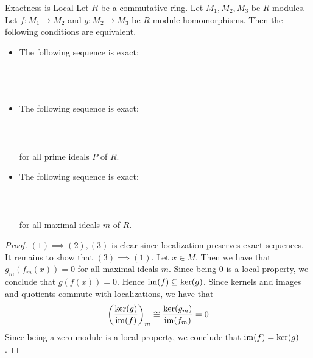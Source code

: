 \documentclass[a4paper]{article}
\begin{document}
\begin{prp}{Exactness is Local}{} Let $R$ be a commutative ring. Let $M_1,M_2,M_3$ be $R$-modules. Let $f:M_1\to M_2$ and $g:M_2\to M_3$ be $R$-module homomorphisms. Then the following conditions are equivalent. 
\begin{itemize}
\item The following sequence is exact: \\~\\
\\~\\
\item The following sequence is exact: \\~\\
\\~\\
for all prime ideals $P$ of $R$. 
\item The following sequence is exact: \\~\\
\\~\\
for all maximal ideals $m$ of $R$. 
\end{itemize} 
\begin{proof}
$(1)\implies(2),(3)$ is clear since localization preserves exact sequences. It remains to show that $(3)\implies(1)$. Let $x\in M$. Then we have that $g_m(f_m(x))=0$ for all maximal ideals $m$. Since being $0$ is a local property, we conclude that $g(f(x))=0$. Hence $\operatorname{im}(f)\subseteq\ker(g)$. Since kernels and images and quotients commute with localizations, we have that $$\left(\frac{\ker(g)}{\operatorname{im}(f)}\right)_m\cong\frac{\ker(g_m)}{\operatorname{im}(f_m)}=0$$ Since being a zero module is a local property, we conclude that $\operatorname{im}(f)=\ker(g)$. 
\end{proof}
\end{prp}
\end{document}
